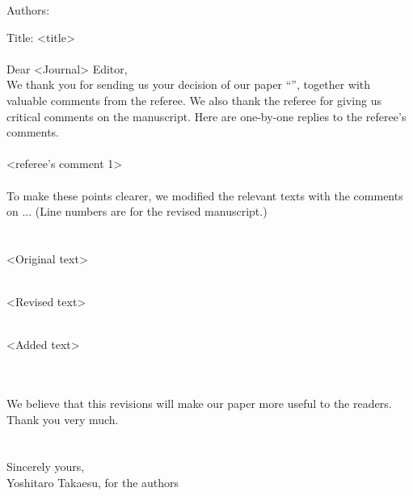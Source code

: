 \documentclass[a4paper,11pt]{article}
\begin{document}

\noindent Authors: 

\noindent Title: <title>\\\\

\noindent Dear <Journal> Editor,\\

\noindent We thank you for sending us your decision of our paper ``'',
together with valuable comments from the referee. We also thank the referee for giving us critical comments on the
manuscript. Here are one-by-one replies to the referee's comments.\\

\\
<referee's comment 1>\\

\\

To make these points clearer, we modified the relevant texts with the
 comments on ... (Line numbers are for the revised manuscript.)\\
 
\\

\\
<Original text>

\\
<Revised text>

\\
<Added text>
\\\\\

\noindent We believe that this revisions will make our paper more useful
to the readers.\\
\noindent Thank you very much.\\\\\\
\noindent Sincerely yours,\\

\noindent Yoshitaro Takaesu, for the authors
\end{document}
